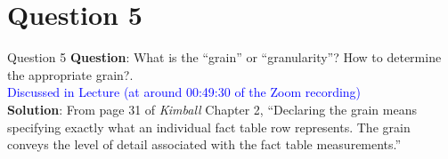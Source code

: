 \section*{Question 5}

\begin{frame}[fragile]{Question 5}
	\textbf{Question}: What is the ``grain'' or ``granularity''? How to determine the appropriate grain?.\\\vspace{10pt}
	\textcolor{blue}{Discussed in Lecture (at around 00:49:30 of the Zoom recording)}\\\vspace{10pt}
	\textbf{Solution}: From page 31 of \textit{Kimball} Chapter 2, ``Declaring the grain means specifying exactly what an individual fact table row represents.  The grain conveys the level of detail associated with the fact table measurements.''\\\vspace{5pt}
\end{frame}

